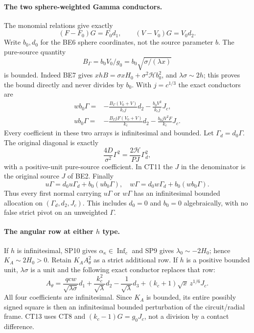 \paragraph{The two sphere-weighted Gamma conductors.}
The monomial relations give exactly
\[
 (F-F_0)G=F_0d_1,\qquad (V-V_0)G=V_0d_2.
                                                               \tag{CT8}
\]
Write $b_0,d_0$ for the BE6 sphere coordinates, not the source
parameter $b$.  The pure-source quantity
\[
 B_\Gamma=b_0V_0/g_0=b_0\sqrt{\sigma/(\lambda x)}
                                                               \tag{CT9}
\]
is bounded.  Indeed BE7 gives
$xhB=\sigma xH_0+\sigma^2\mathcal H b_0^2$, and
$\lambda\sigma\sim2h$; this proves the bound directly and never
divides by $b_0$.  With $j=c^{1/3}$ the exact conductors are
\[
\begin{split}
 w b_0\Gamma={}&-\frac{B_\Gamma(V_0+V)}{k_cj}d_2
                       -\frac{b_0V^2}{k_cj}J_c,\\
 u b_0\Gamma={}&-\frac{B_\Gamma jF(V_0+V)}{k_c}d_2
                       -\frac{b_0jV^2F}{k_c}J_c.              \end{split} \tag{CT10}
\]
Every coefficient in these two arrays is infinitesimal and bounded.
Let $\Gamma_d=d_0\Gamma$.  The original diagonal is exactly
\[
 \frac{4D}{\sigma^2}\Gamma^2
       =\frac{2\mathcal H}{PJ}\Gamma_d^2,       \tag{CT11}
\]
with a positive-unit pure-source coefficient.  In CT11 the $J$ in
the denominator is the original source $J$ of BE2.  Finally
\[
 u\Gamma=d_0u\Gamma_d+b_0(u b_0\Gamma),\quad
 w\Gamma=d_0w\Gamma_d+b_0(w b_0\Gamma).         \tag{CT12}
\]
Thus every first normal carrying $u\Gamma$ or $w\Gamma$ has an
infinitesimal bounded allocation on $(\Gamma_d,d_2,J_c)$.
This includes $d_0=0$ and $b_0=0$ algebraically, with no false
strict pivot on an unweighted $\Gamma$.

\paragraph{The angular row at either $h$ type.}
If $h$ is infinitesimal, SP10 gives
$\alpha_\kappa\in\operatorname{Inf}_c$ and SP9 gives
$\lambda_0\sim-2H_0$; hence $K_A\sim2H_0>0$.  Retain
$K_AA_\theta^2$ as a strict additional row.
If $h$ is a positive bounded unit, $\lambda\sigma$ is a unit and
the following exact conductor replaces that row:
\[
 A_\theta=
 \frac{qcw}{\sqrt{\lambda\sigma}}d_1
 +\frac{k_c^2}{\sqrt\lambda}d_2
 -\frac1{\sqrt\lambda}d_3
 +(k_c+1)\sqrt x\,z^{1/6}J_c.                 \tag{CT13}
\]
All four coefficients are infinitesimal.  Since $K_A$ is bounded,
its entire possibly signed square is then an infinitesimal bounded
perturbation of the circuit/radial frame.  CT13 uses CT8 and
$(k_c-1)G=g_0J_c$, not a division by a contact difference.

